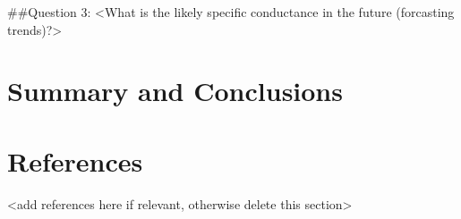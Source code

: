 \documentclass[
  12pt,
]{article}
\begin{document}
\#\#Question 3: \textless What is the likely specific conductance in the
future (forcasting trends)?\textgreater{}

\newpage

\hypertarget{summary-and-conclusions}{%
\section{Summary and Conclusions}\label{summary-and-conclusions}}

\newpage

\hypertarget{references}{%
\section{References}\label{references}}

\textless add references here if relevant, otherwise delete this
section\textgreater{}
\end{document}
